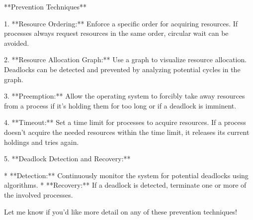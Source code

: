 \documentclass[a4paper,12pt]{article}
\begin{document}
\begin{enumerate}
\begin{minipage}{0.7\textwidth}
**Prevention Techniques**

1. **Resource Ordering:** Enforce a specific order for acquiring resources. If processes always request resources in the same order, circular wait can be avoided.

2. **Resource Allocation Graph:**  Use a graph to visualize resource allocation. Deadlocks can be detected and prevented by analyzing potential cycles in the graph.

3. **Preemption:** Allow the operating system to forcibly take away resources from a process if it's holding them for too long or if a deadlock is imminent.

4. **Timeout:** Set a time limit for processes to acquire resources. If a process doesn't acquire the needed resources within the time limit, it releases its current holdings and tries again.

5. **Deadlock Detection and Recovery:**

   * **Detection:**  Continuously monitor the system for potential deadlocks using algorithms.
   * **Recovery:** If a deadlock is detected, terminate one or more of the involved processes.



Let me know if you'd like more detail on any of these prevention techniques!


\end{minipage}
\end{enumerate}
\end{document}
